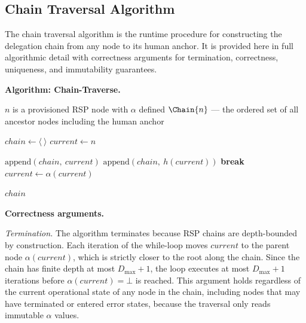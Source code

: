 \subsection{Chain Traversal Algorithm}
\label{sec:chain-traversal-algorithm}

The chain traversal algorithm is the runtime procedure for constructing the delegation chain from any node to its human anchor. It is provided here in full algorithmic detail with correctness arguments for termination, correctness, uniqueness, and immutability guarantees.

\medskip
\noindent\textbf{Algorithm: Chain-Traverse.}

\begin{algorithm}
\caption{Chain-Traverse($n$) --- Build the delegation chain from node $n$ to the human anchor}
\label{alg:chain-traverse}
\begin{algorithmic}[1]
\REQUIRE $n$ is a provisioned RSP node with $\alpha$ defined
\ENSURE $\Chain{n}$ --- the ordered set of all ancestor nodes including the human anchor

\STATE $chain \leftarrow \langle\ \rangle$ 
\STATE $current \leftarrow n$ 

    \STATE $\mathrm{append}(chain,\ current)$ 
        \STATE $\mathrm{append}(chain,\ h(current))$ 
        \STATE \textbf{break}
    \ENDIF
    \STATE $current \leftarrow \alpha(current)$ 
\ENDWHILE

\RETURN $chain$
\end{algorithmic}
\end{algorithm}

\medskip
\noindent\textbf{Correctness arguments.}

\textit{Termination.} The algorithm terminates because RSP chains are depth-bounded by construction. Each iteration of the while-loop moves $current$ to the parent node $\alpha(current)$, which is strictly closer to the root along the chain. Since the chain has finite depth at most $D_{\max} + 1$, the loop executes at most $D_{\max} + 1$ iterations before $\alpha(current) = \bot$ is reached. This argument holds regardless of the current operational state of any node in the chain, including nodes that may have terminated or entered error states, because the traversal only reads immutable $\alpha$ values.

